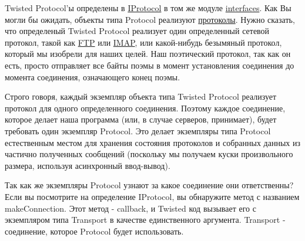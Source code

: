 Twisted Protocol'ы определены в
\href{http://twistedmatrix.com/trac/browser/tags/releases/twisted-8.2.0/twisted/internet/interfaces.py#L1111}{IProtocol} 
в том же модуле 
\href{http://twistedmatrix.com/trac/browser/tags/releases/twisted-8.2.0/twisted/internet/interfaces.py}{interfaces}. 
Как Вы могли бы ожидать, объекты типа Protocol реализуют  
\href{http://en.wikipedia.org/wiki/Protocol\_(computing)}{протоколы}. 
Нужно сказать, что определеный Twisted Protocol реализует 
один определенный сетевой протокол, такой как 
\href{http://en.wikipedia.org/wiki/File\_Transfer\_Protocol}{FTP} или 
\href{http://en.wikipedia.org/wiki/Internet\_Message\_Access\_Protocol}{IMAP}, 
или какой-нибудь безымяный протокол, который мы изобрели 
для наших целей. Наш поэтический протокол, так как он есть, 
просто отправляет все байты поэмы в момент установления соединения до 
момента соединения, означающего конец поэмы. 


Строго говоря, каждый экземпляр объекта типа Twisted Protocol 
реализует протокол для одного определенного соединения. Поэтому 
каждое соединение, которое делает наша программа (или, в случае серверов, принимает), 
будет требовать один экземпляр Protocol. Это делает 
экземпляры типа Protocol естественным местом для хранения состояния 
протоколов и собранных данных из частично полученных сообщений (поскольку 
мы получаем куски произвольного размера, используя асинхронный ввод-вывод). 



Так как же экземпляры Protocol узнают за какое соединение 
они ответственны? Если вы посмотрите на определение IProtocol, 
вы обнаружите метод с названием makeConnection. Этот метод - callback, и 
Twisted код вызывает его с экземпляром типа Transport в качестве 
единственного аргумента. Transport - соединение, которое Protocol 
будет использовать.

